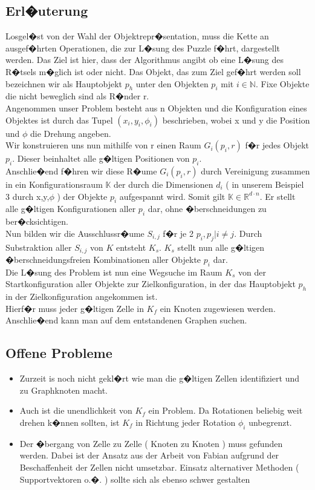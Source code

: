 
\subsection{Erl�uterung}
Losgel�st von der Wahl der Objektrepr�sentation, muss die Kette an ausgef�hrten Operationen, die zur L�sung des Puzzle f�hrt, dargestellt werden. Das Ziel ist hier, dass der Algorithmus angibt ob eine L�sung des R�tsels m�glich ist oder nicht. Das Objekt, das zum Ziel gef�hrt werden soll bezeichnen wir als Hauptobjekt $p_h$ unter den Objekten $p_i$ mit $i \in \mathbb{N}$. Fixe Objekte die nicht beweglich sind als R�nder r. \\

Angenommen unser Problem besteht aus n Objekten und die Konfiguration eines Objektes ist durch das Tupel $(x_i,y_i,\phi_i)$ beschrieben, wobei x und y die Position und $\phi$ die Drehung angeben.\\
Wir konstruieren uns nun mithilfe von r einen Raum $G_i(p_i,r)$ f�r jedes Objekt $p_i$. Dieser beinhaltet alle g�ltigen Positionen von $p_i$.\\

Anschlie�end f�hren wir diese R�ume $G_i(p_i,r)$ durch Vereinigung zusammen in ein Konfigurationsraum $\mathbb{K}$ der durch die Dimensionen $d_i$ ( in unserem Beispiel 3 durch x,y,$\phi$ )  der Objekte $p_i$ aufgespannt wird. Somit gilt $\mathbb{K} \in \mathbb{R}^{d \cdot n}$.  Er stellt alle g�ltigen Konfigurationen aller $p_i$ dar, ohne �berschneidungen zu ber�cksichtigen.\\

Nun bilden wir die Ausschlussr�ume $S_{i,j}$ f�r je 2 $p_i, p_j |  i\neq j$. Durch Substraktion aller $S_{i,j}$ von $K$ entsteht $K_s$. $K_s$ stellt nun alle g�ltigen �berschneidungsfreien Kombinationen aller Objekte $p_i$ dar.\\

Die L�sung des Problem ist nun eine Wegsuche im Raum $K_s$ von der Startkonfiguration aller Objekte zur Zielkonfiguration, in der das Hauptobjekt $p_h$ in der Zielkonfiguration angekommen ist. \\

Hierf�r muss jeder g�ltigen Zelle in $K_f$ ein Knoten zugewiesen werden. Anschlie�end kann man auf dem entstandenen Graphen suchen.

\subsection{Offene Probleme}
\begin{itemize}
\item Zurzeit is noch nicht gekl�rt wie man die g�ltigen Zellen identifiziert und zu Graphknoten macht.
\item Auch ist die unendlichkeit von $K_f$ ein Problem. Da Rotationen beliebig weit drehen k�nnen sollten, ist $K_f$ in Richtung jeder Rotation $\phi_i$ unbegrenzt.
\item Der �bergang von Zelle zu Zelle ( Knoten zu Knoten ) muss gefunden werden. Dabei ist der Ansatz aus der Arbeit von Fabian aufgrund der Beschaffenheit der Zellen nicht umsetzbar. Einsatz alternativer Methoden ( Supportvektoren o.�. ) sollte sich als ebenso schwer gestalten
\end{itemize}
